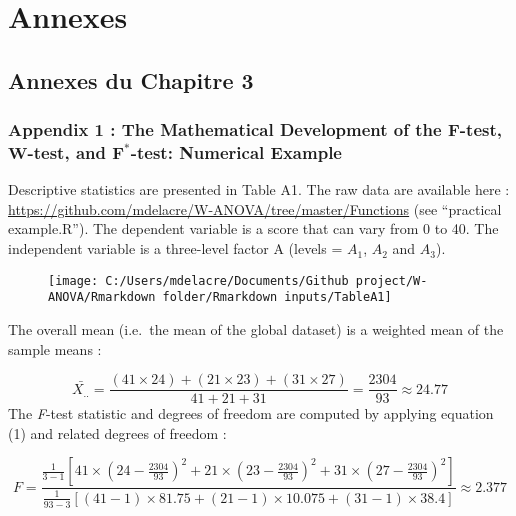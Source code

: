 \documentclass[
]{article}
\author{}
\date{\vspace{-2.5em}}
\begin{document}


\hypertarget{annexes}{%
\section{Annexes}\label{annexes}}

\hypertarget{annexes-du-chapitre-3}{%
\subsection{Annexes du Chapitre 3}\label{annexes-du-chapitre-3}}

\hypertarget{appendix-1-the-mathematical-development-of-the-bmf-test-bmw-test-and-bmf-test-numerical-example}{%
\subsubsection{\texorpdfstring{Appendix 1 : The Mathematical Development
of the \(\bm{F}\)-test, \(\bm{W}\)-test, and \(\bm{F^*}\)-test:
Numerical
Example}{Appendix 1 : The Mathematical Development of the \textbackslash bm\{F\}-test, \textbackslash bm\{W\}-test, and \textbackslash bm\{F\^{}*\}-test: Numerical Example}}\label{appendix-1-the-mathematical-development-of-the-bmf-test-bmw-test-and-bmf-test-numerical-example}}

Descriptive statistics are presented in Table A1. The raw data are
available here :
\url{https://github.com/mdelacre/W-ANOVA/tree/master/Functions} (see
``practical example.R''). The dependent variable is a score that can
vary from 0 to 40. The independent variable is a three-level factor A
(levels = \(A_1\), \(A_2\) and \(A_3\)).

\begin{figure}
\texttt{[image: C:/Users/mdelacre/Documents/Github project/W-ANOVA/Rmarkdown folder/Rmarkdown inputs/TableA1]} \end{figure}

The overall mean (i.e.~the mean of the global dataset) is a weighted
mean of the sample means :

\[\bar{X_{..}}=\frac{(41\times24)+(21\times23)+(31\times27)}{41+21+31}=\frac{2304}{93} \approx 24.77\]
The \emph{F}-test statistic and degrees of freedom are computed by
applying equation (1) and related degrees of freedom :

\[
F=\frac{\frac{1}{3-1}[41\times(24-\frac{2304}{93})^2+21\times(23-\frac{2304}{93})^2+31\times(27-\frac{2304}{93})^2]}
{\frac{1}{93-3}[(41-1)\times81.75+(21-1)\times10.075+(31-1)\times38.4]} \approx 2.377
\]
\end{document}
